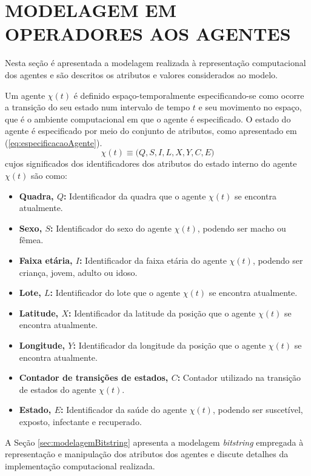 \section{MODELAGEM EM OPERADORES AOS AGENTES}
\label{sec:modelagemAgentes}

Nesta seção é apresentada a modelagem realizada à representação computacional dos agentes e são descritos os atributos e valores considerados ao modelo.

Um agente $\chi(t)$ é definido espaço-temporalmente especificando-se como ocorre a transição do seu estado num intervalo de tempo $t$ e seu movimento no espaço, que é o ambiente computacional em que o agente é especificado. O estado do agente é especificado por meio do conjunto de atributos, como apresentado em (\ref{eq:especificacaoAgente}).
\begin{equation}
\label{eq:especificacaoAgente}
 \chi(t) \equiv \big(Q, S, I, L, X, Y, C, E \big)
\end{equation}
cujos significados dos identificadores dos atributos do estado interno do agente $\chi(t)$ são como:

\begin{itemize}
 \item \textbf{Quadra, $Q$:} Identificador da quadra que o agente $\chi(t)$ se encontra atualmente.
 \item \textbf{Sexo, $S$:} Identificador do sexo do agente $\chi(t)$, podendo ser macho ou fêmea.
 \item \textbf{Faixa etária, $I$:} Identificador da faixa etária do agente $\chi(t)$, podendo ser criança, jovem, adulto ou idoso.
 \item \textbf{Lote, $L$:} Identificador do lote que o agente $\chi(t)$ se encontra atualmente.
 \item \textbf{Latitude, $X$:} Identificador da latitude da posição que o agente $\chi(t)$ se encontra atualmente.
 \item \textbf{Longitude, $Y$:} Identificador da longitude da posição que o agente $\chi(t)$ se encontra atualmente.
 \item \textbf{Contador de transições de estados, $C$:} Contador utilizado na transição de estados do agente $\chi(t)$.
 \item \textbf{Estado, $E$:} Identificador da saúde do agente $\chi(t)$, podendo ser suscetível, exposto, infectante e recuperado.
\end{itemize}

A Seção \ref{sec:modelagemBitstring} apresenta a modelagem \textit{bitstring} empregada à representação e manipulação dos atributos dos agentes e discute detalhes da implementação computacional realizada.

\newpage